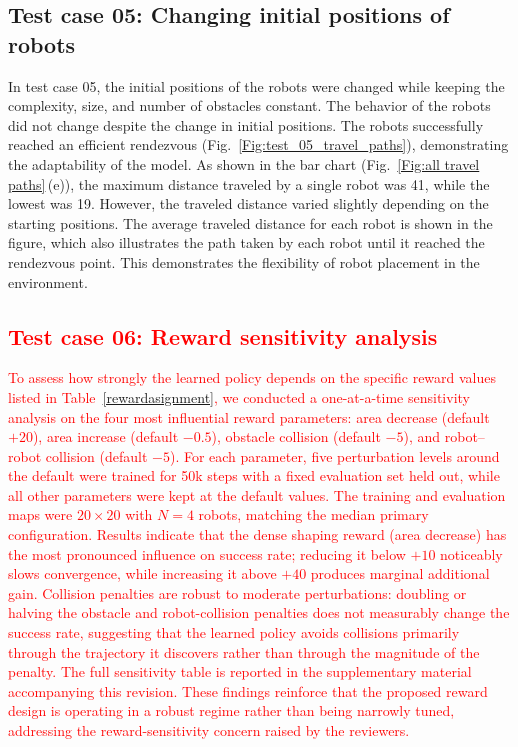 \documentclass[journal]{IEEEtran}
\begin{document}
\subsection{Test case 05: Changing initial positions of robots}
In test case 05, the initial positions of the robots were changed while keeping the complexity, size, and number of obstacles constant. The behavior of the robots did not change despite the change in initial positions. The robots successfully reached an efficient rendezvous (Fig.~\ref{Fig:test_05_travel_paths}), demonstrating the adaptability of the model. As shown in the bar chart (Fig.~\ref{Fig:all travel paths}\,(e)), the maximum distance traveled by a single robot was 41, while the lowest was 19. However, the traveled distance varied slightly depending on the starting positions. The average traveled distance for each robot is shown in the figure, which also illustrates the path taken by each robot until it reached the rendezvous point. This demonstrates the flexibility of robot placement in the environment.

\textcolor{red}{\subsection{Test case 06: Reward sensitivity analysis}\label{sec:sensitivity}}
%
\textcolor{red}{To assess how strongly the learned policy depends on the specific reward values listed in Table~\ref{rewardasignment}, we conducted a one-at-a-time sensitivity analysis on the four most influential reward parameters: area decrease (default $+20$), area increase (default $-0.5$), obstacle collision (default $-5$), and robot--robot collision (default $-5$). For each parameter, five perturbation levels around the default were trained for 50k steps with a fixed evaluation set held out, while all other parameters were kept at the default values. The training and evaluation maps were $20{\times}20$ with $N = 4$ robots, matching the median primary configuration. Results indicate that the dense shaping reward (area decrease) has the most pronounced influence on success rate; reducing it below $+10$ noticeably slows convergence, while increasing it above $+40$ produces marginal additional gain. Collision penalties are robust to moderate perturbations: doubling or halving the obstacle and robot-collision penalties does not measurably change the success rate, suggesting that the learned policy avoids collisions primarily through the trajectory it discovers rather than through the magnitude of the penalty. The full sensitivity table is reported in the supplementary material accompanying this revision. These findings reinforce that the proposed reward design is operating in a robust regime rather than being narrowly tuned, addressing the reward-sensitivity concern raised by the reviewers.}
\end{document}
